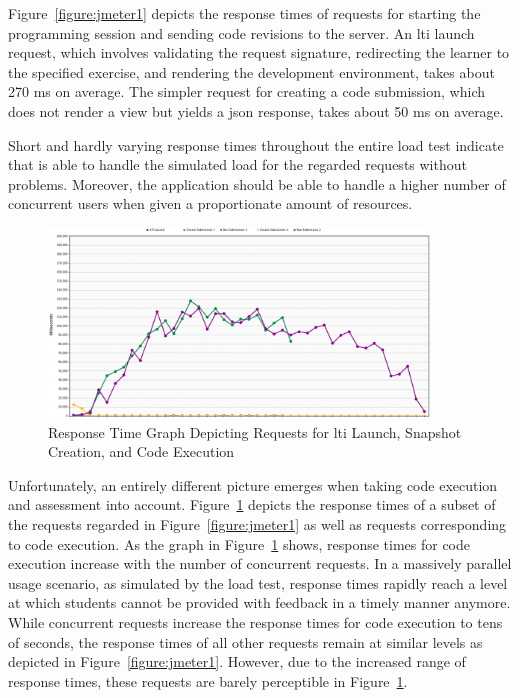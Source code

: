Figure~\ref{figure:jmeter1} depicts the response times of requests for starting the programming session and sending code revisions to the server. An \gls{lti} launch request, which involves validating the request signature, redirecting the learner to the specified exercise, and rendering the development environment, takes about 270 ms on average. The simpler request for creating a code submission, which does not render a view but yields a \gls{json} response, takes about 50 ms on average.

Short and hardly varying response times throughout the entire load test indicate that \tool is able to handle the simulated load for the regarded requests without problems. Moreover, the application should be able to handle a higher number of concurrent users when given a proportionate amount of resources.

\begin{figure}
\centering
\hspace{-0.5cm}
\includegraphics[width=0.9\textwidth]{images/jmeter2.png}
\caption{Response Time Graph Depicting Requests for \gls{lti} Launch, Snapshot Creation, and Code Execution}
\label{figure:jmeter2}
\end{figure}

Unfortunately, an entirely different picture emerges when taking code execution and assessment into account. Figure~\ref{figure:jmeter2} depicts the response times of a subset of the requests regarded in Figure~\ref{figure:jmeter1} as well as requests corresponding to code execution. As the graph in Figure~\ref{figure:jmeter2} shows, response times for code execution increase with the number of concurrent requests. In a massively parallel usage scenario, as simulated by the load test, response times rapidly reach a level at which students cannot be provided with feedback in a timely manner anymore. While concurrent requests increase the response times for code execution to tens of seconds, the response times of all other requests remain at similar levels as depicted in Figure~\ref{figure:jmeter1}. However, due to the increased range of response times, these requests are barely perceptible in Figure~\ref{figure:jmeter2}.

